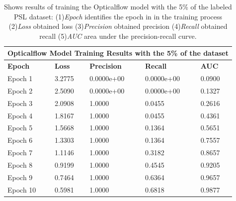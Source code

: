 \documentclass[twocolumn,conference]{article}
\begin{document}
\begin{table}[!htb]
\captionsetup{font=footnotesize}
\centering
\begin{tabular}{ p{2.8cm} p{2.8cm} p{2.8cm} p{2.8cm} p{2.8cm} }
\toprule
\multicolumn{5}{c}{\textbf{Opticalflow Model Training Results with the 5\% of the dataset}} \\
\hline
\hline
\textbf{Epoch}&	\textbf{Loss}	&\textbf{Precision}	&\textbf{Recall}	&\textbf{AUC} \\
\hline
\midrule
Epoch 1&	3.2775&	0.0000e+00&	0.0000e+00&	0.0900\\
Epoch 2&	2.5090&	0.0000e+00&	0.0000e+00&	0.1327\\
Epoch 3&	2.0908&	1.0000&	0.0455&	0.2616\\
Epoch 4&	1.8167&	1.0000&	0.0455&	0.4361\\
Epoch 5&	1.5668&	1.0000&	0.1364&	0.5651\\
Epoch 6&	1.3303&	1.0000&	0.1364&	0.7557\\
Epoch 7&	1.1146&	1.0000&	0.3182&	0.8657\\
Epoch 8&	0.9199&	1.0000&	0.4545&	0.9205\\
Epoch 9&	0.7464&	1.0000&	0.6364&	0.9657\\
Epoch 10&	0.5981&	1.0000&	0.6818&	0.9877\\
\bottomrule
\end{tabular}
\caption{Shows results of training the Opticalflow model with the 5\% of the labeled PSL dataset: (1)\textit{Epoch} identifies the epoch in in the training process (2)\textit{Loss} obtained loss (3)\textit{Precision} obtained precision (4)\textit{Recall} obtained recall (5)\textit{AUC} area under the precision-recall curve.}
\label{tab:opticalflow-detection-results-5-percent}
\end{table}
\end{document}
